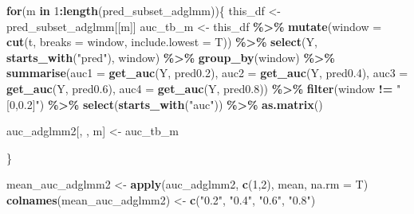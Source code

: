 \documentclass[
]{article}
\newenvironment{Shaded}{\begin{snugshade}}{\end{snugshade}}
\newcommand{\AttributeTok}[1]{\textcolor[rgb]{0.13,0.29,0.53}{#1}}
\newcommand{\ControlFlowTok}[1]{\textcolor[rgb]{0.13,0.29,0.53}{\textbf{#1}}}
\newcommand{\DecValTok}[1]{\textcolor[rgb]{0.00,0.00,0.81}{#1}}
\newcommand{\FloatTok}[1]{\textcolor[rgb]{0.00,0.00,0.81}{#1}}
\newcommand{\FunctionTok}[1]{\textcolor[rgb]{0.13,0.29,0.53}{\textbf{#1}}}
\newcommand{\NormalTok}[1]{#1}
\newcommand{\OtherTok}[1]{\textcolor[rgb]{0.56,0.35,0.01}{#1}}
\newcommand{\SpecialCharTok}[1]{\textcolor[rgb]{0.81,0.36,0.00}{\textbf{#1}}}
\newcommand{\StringTok}[1]{\textcolor[rgb]{0.31,0.60,0.02}{#1}}
\begin{document}
\begin{Shaded}
\begin{Highlighting}[]
\ControlFlowTok{for}\NormalTok{(m }\ControlFlowTok{in} \DecValTok{1}\SpecialCharTok{:}\FunctionTok{length}\NormalTok{(pred\_subset\_adglmm))\{}
\NormalTok{  this\_df }\OtherTok{\textless{}{-}}\NormalTok{ pred\_subset\_adglmm[[m]]}
\NormalTok{  auc\_tb\_m }\OtherTok{\textless{}{-}}\NormalTok{ this\_df }\SpecialCharTok{\%\textgreater{}\%}
  \FunctionTok{mutate}\NormalTok{(}\AttributeTok{window =} \FunctionTok{cut}\NormalTok{(t, }\AttributeTok{breaks =}\NormalTok{ window, }\AttributeTok{include.lowest =}\NormalTok{ T)) }\SpecialCharTok{\%\textgreater{}\%} 
  \FunctionTok{select}\NormalTok{(Y, }\FunctionTok{starts\_with}\NormalTok{(}\StringTok{"pred"}\NormalTok{), window) }\SpecialCharTok{\%\textgreater{}\%}
  \FunctionTok{group\_by}\NormalTok{(window) }\SpecialCharTok{\%\textgreater{}\%}
  \FunctionTok{summarise}\NormalTok{(}\AttributeTok{auc1 =} \FunctionTok{get\_auc}\NormalTok{(Y, pred0}\FloatTok{.2}\NormalTok{),}
            \AttributeTok{auc2 =} \FunctionTok{get\_auc}\NormalTok{(Y, pred0}\FloatTok{.4}\NormalTok{),}
            \AttributeTok{auc3 =} \FunctionTok{get\_auc}\NormalTok{(Y, pred0}\FloatTok{.6}\NormalTok{),}
            \AttributeTok{auc4 =} \FunctionTok{get\_auc}\NormalTok{(Y, pred0}\FloatTok{.8}\NormalTok{)) }\SpecialCharTok{\%\textgreater{}\%}
  \FunctionTok{filter}\NormalTok{(window }\SpecialCharTok{!=} \StringTok{"[0,0.2]"}\NormalTok{) }\SpecialCharTok{\%\textgreater{}\%} 
  \FunctionTok{select}\NormalTok{(}\FunctionTok{starts\_with}\NormalTok{(}\StringTok{"auc"}\NormalTok{)) }\SpecialCharTok{\%\textgreater{}\%} \FunctionTok{as.matrix}\NormalTok{()}
  
\NormalTok{  auc\_adglmm2[, , m] }\OtherTok{\textless{}{-}}\NormalTok{ auc\_tb\_m}
  
\NormalTok{\}}

\NormalTok{mean\_auc\_adglmm2 }\OtherTok{\textless{}{-}} \FunctionTok{apply}\NormalTok{(auc\_adglmm2, }\FunctionTok{c}\NormalTok{(}\DecValTok{1}\NormalTok{,}\DecValTok{2}\NormalTok{), mean, }\AttributeTok{na.rm =}\NormalTok{ T)}
\FunctionTok{colnames}\NormalTok{(mean\_auc\_adglmm2) }\OtherTok{\textless{}{-}} \FunctionTok{c}\NormalTok{(}\StringTok{"0.2"}\NormalTok{, }\StringTok{"0.4"}\NormalTok{, }\StringTok{"0.6"}\NormalTok{, }\StringTok{"0.8"}\NormalTok{)}
\end{Highlighting}
\end{Shaded}
\end{document}
